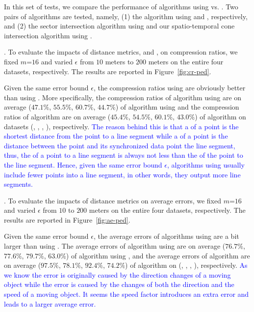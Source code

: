 {In this set of tests, we compare the performance of algorithms using \ped vs. \sed. Two pairs of algorithms are tested, namely, (1) the algorithm \dpa using \ped and \sed, respectively, and (2) the sector intersection  algorithm \cite{Williams:Longest, Sklansky:Cone} using \ped and our spatio-temporal cone intersection algorithm using \sed.

.
To evaluate the impacts of distance metrics, \ie \ped and \sed, on compression ratios, we fixed {$m$=$16$} and varied $\epsilon$ from $10$ meters to $200$ meters on the entire four datasets, respectively.
The results are reported in Figure~\ref{fig:cr-ped}.


Given the same error bound $\epsilon$, the compression ratios using \ped are obviously better
than using \sed.
More specifically, the compression ratios of algorithm \dpa
using \ped are on average ($47.1\%$, $55.5\%$, $60.7\%$, $44.7\%$) of algorithm \dpa using \sed and
the compression ratios of algorithm \cist are on average
($45.4\%$, $54.5\%$, $60.1\%$, $43.0\%$) of algorithm  on datasets (\sercar, \geolife, \mopsi, \pricar), respectively.
\textcolor{blue}{
The reason behind this is that a \ped of a point is the shortest
distance from the point to a line segment while a \sed of a point is the distance between the point and its synchronized data point \wrt the line segment, thus, the \sed of a point to a line segment is always not less than the \ped of the point to the line segment. Hence, given the same error bound $\epsilon$, \lsa algorithms using \sed usually include fewer points into a line segment, in other words, they output more line segments.}

.
To evaluate the impacts of distance metrics on average errors, we fixed {$m$=$16$} and varied $\epsilon$ from $10$ to $200$ meters on the entire four datasets, respectively.
The results are reported in Figure~\ref{fig:ae-ped}.


Given the same error bound $\epsilon$, the average errors of algorithms using \sed are a bit larger than using \ped.
The average errors of algorithm \dpa using \ped are on average
($76.7\%$, $77.6\%$, $79.7\%$, $63.0\%$) of algorithm \dpa  using \sed, and  the average
errors of algorithm   are on average
($97.5\%$, $78.1\%$, $92.4\%$, $74.2\%$) of algorithm \cist on (\sercar, \geolife, \mopsi, \pricar), respectively.
\textcolor{blue}{As we know the \ped error is originally caused by the direction changes of a moving object while the
\sed error is caused by the changes of both the direction and the speed of a moving object. It seems the speed factor introduces an extra error and leads to a larger average error. }


}
